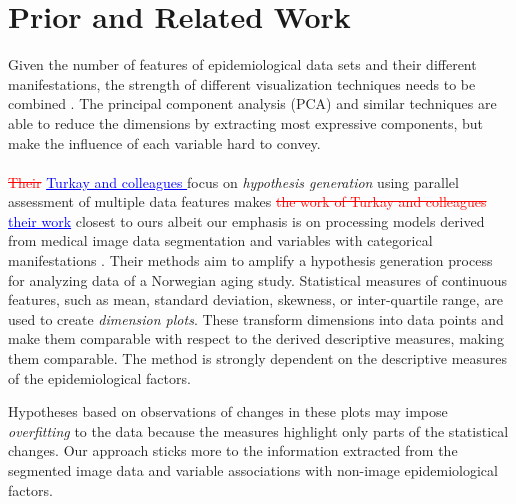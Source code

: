 \documentclass[journal]{style/vgtc} 			          %
\newcommand{\rem}[1]{\textcolor{red}{\sout{#1}}}
\newcommand{\add}[1]{\textcolor{blue}{\uline{#1}}}
\begin{document}
\section{Prior and Related Work}
%
Given the number of features of epidemiological data sets and their different manifestations, the strength of different visualization techniques needs to be combined \cite{Buja91, Konyha2009}.
%
The principal component analysis (PCA) and similar techniques are able to reduce the dimensions by extracting most expressive components, but make the influence of each variable hard to convey.
\\\\
\rem{Their} \add{Turkay and colleagues \cite{Turkay2013}} focus on \emph{hypothesis generation} using parallel assessment of multiple data features makes \rem{the work of Turkay and colleagues} \add{their work} closest to ours albeit our emphasis is on processing models derived from medical image data segmentation and variables with categorical manifestations \rem{\cite{Turkay2013}}.
%
Their methods aim to amplify a hypothesis generation process for analyzing data of a Norwegian aging study.
%
Statistical measures of continuous features, such as mean, standard deviation, skewness, or inter-quartile range, are used to create \emph{dimension plots}. %
%
These transform dimensions into data points and make them comparable with respect to the derived descriptive measures, making them comparable.
%
%
%
%
The method is strongly dependent on the descriptive measures of the epidemiological factors.

Hypotheses based on observations of changes in these plots may impose \emph{overfitting} to the data because the measures highlight only parts of the statistical changes.
%
Our approach sticks more to the information extracted from the segmented image data and variable associations with non-image epidemiological factors.
\end{document}
